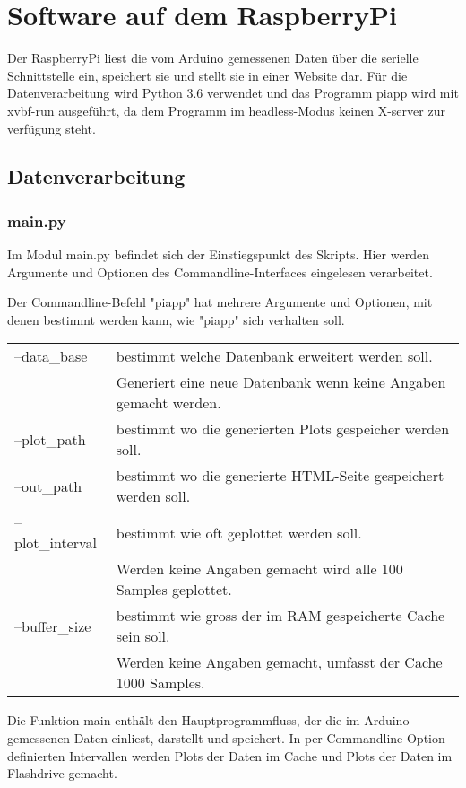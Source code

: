 \documentclass{article}
\begin{document}
\section{Software auf dem RaspberryPi}
Der RaspberryPi liest die vom Arduino gemessenen Daten über die serielle Schnittstelle ein, speichert sie und stellt sie in einer Website dar.
Für die Datenverarbeitung wird Python 3.6 verwendet und das Programm piapp wird mit xvbf-run ausgeführt, da dem Programm im headless-Modus keinen X-server zur verfügung steht.
\subsection{Datenverarbeitung}
\subsubsection{main.py}
Im Modul main.py befindet sich der Einstiegspunkt des Skripts.
Hier werden Argumente und Optionen des Commandline-Interfaces eingelesen verarbeitet.

Der Commandline-Befehl "piapp" hat mehrere Argumente und Optionen, mit denen bestimmt werden kann, wie "piapp" sich verhalten soll.

\begin{tabular}{l l}
--data\_base     & bestimmt welche Datenbank erweitert werden soll. \\
~                & Generiert eine neue Datenbank wenn keine Angaben gemacht werden. \\
--plot\_path     & bestimmt wo die generierten Plots gespeicher werden soll. \\
--out\_path      & bestimmt wo die generierte HTML-Seite gespeichert werden soll. \\
--plot\_interval & bestimmt wie oft geplottet werden soll. \\
~                & Werden keine Angaben gemacht wird alle 100 Samples geplottet. \\
--buffer\_size   & bestimmt wie gross der im RAM gespeicherte Cache sein soll. \\
~                & Werden keine Angaben gemacht, umfasst der Cache 1000 Samples. 
\end{tabular}

Die Funktion main enthält den Hauptprogrammfluss, der die im Arduino gemessenen Daten einliest, darstellt und speichert.
In per Commandline-Option definierten Intervallen werden Plots der Daten im Cache und Plots der Daten im Flashdrive gemacht.
\end{document}
